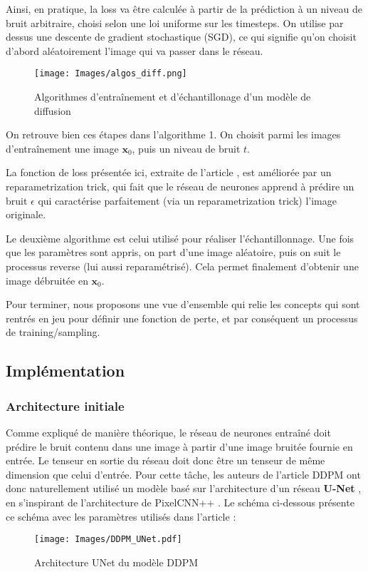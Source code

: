 \documentclass{article}
\begin{document}
Ainsi, en pratique, la loss va être calculée à partir de la prédiction à un niveau de bruit arbitraire, choisi selon une loi uniforme sur les timesteps. On utilise par dessus une descente de gradient stochastique (SGD), ce qui signifie qu'on choisit d'abord aléatoirement l'image qui va passer dans le réseau.

\begin{figure}[H]
    \centering
    \texttt{[image: Images/algos\_diff.png]}
    \caption{Algorithmes d'entraînement et d'échantillonage d'un modèle de diffusion}
\end{figure}

On retrouve bien ces étapes dans l'algorithme 1. On choisit parmi les images d'entraînement une image $\textbf{x}_0$, puis un niveau de bruit $t$.

La fonction de loss présentée ici, extraite de l'article \cite{DIFF20}, est améliorée par un reparametrization trick, qui fait que le réseau de neurones apprend à prédire un bruit $\epsilon$ qui caractérise parfaitement (via un reparametrization trick) l'image originale.

Le deuxième algorithme est celui utilisé pour réaliser l'échantillonnage. Une fois que les paramètres sont appris, on part d'une image aléatoire, puis on suit le processus reverse (lui aussi reparamétrisé). Cela permet finalement d'obtenir une image débruitée en $\textbf{x}_0$.

Pour terminer, nous proposons une vue d'ensemble qui relie les concepts qui sont rentrés en jeu pour définir une fonction de perte, et par conséquent un processus de training/sampling.


\subsection{Implémentation}
\subsubsection{Architecture initiale}

Comme expliqué de manière théorique, le réseau de neurones entraîné doit prédire le bruit contenu dans une image à partir d'une image bruitée fournie en entrée. Le tenseur en sortie du réseau doit donc être un tenseur de même dimension que celui d'entrée. Pour cette tâche, les auteurs de l'article DDPM ont donc naturellement utilisé un modèle basé sur l'architecture d'un réseau \textbf{U-Net} \cite{U-Net}, en s'inspirant de l'architecture de PixelCNN++ \cite{pixelcnn++}. Le schéma ci-dessous présente ce schéma avec les paramètres utilisés dans l'article :
\begin{figure}[H]
    \centering
    \texttt{[image: Images/DDPM\_UNet.pdf]}
    \caption{Architecture UNet du modèle DDPM \cite{ddpm_unet_schema}}
    \label{UNet-DDPM}
\end{figure}
\end{document}
